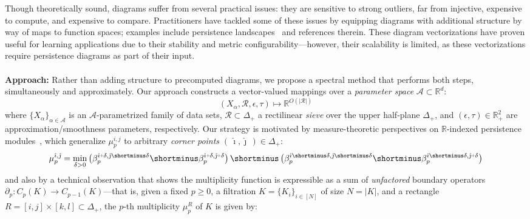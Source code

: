 \documentclass[10pt twocolumn]{article}
\numberwithin{equation}{section}
\newcommand{\+}{%
	\raisebox{0.18ex}{\scaleobj{0.55}{+}}
}
\theoremstyle{definition}
\theoremstyle{definition}
\begin{document}
\begin{multicols}{2}
Though theoretically sound, diagrams suffer from several practical issues: they are sensitive to strong outliers, far from injective, expensive to compute, and expensive to compare. 
Practitioners have tackled some of these issues by equipping diagrams with additional structure by way of maps to function spaces; examples include persistence landscapes~\cite{bubenik2015statistical} and references therein. 
These diagram vectorizations have proven useful for learning applications due to their stability and  metric configurability---however, their scalability is limited, as these vectorizations require persistence diagrams as part of their input. %
\\
\\
\noindent \textbf{Approach:}
Rather than adding structure to precomputed diagrams, we propose a spectral method that performs both steps, simultaneously and approximately. 
Our approach constructs a vector-valued mappings over a \emph{parameter space} $\mathcal{A} \subset \mathbb{R}^d$: 
\begin{equation*}\label{eq:relaxation_mapping}
	(X_\alpha, \mathcal{R}, \epsilon, \tau) \mapsto \mathbb{R}^{O(\lvert \mathcal{R} \rvert)}
\end{equation*}
where $\{X_\alpha\}_{\alpha \in \mathcal{A}}$ is an  $\mathcal{A}$-parametrized family of data sets, $\mathcal{R} \subset \Delta_+$ a rectilinear \emph{sieve} over the upper half-plane $\Delta_+$, and $(\epsilon, \tau) \in \mathbb{R}_+^2$ are approximation/smoothness parameters, respectively.
Our strategy is motivated by measure-theoretic perspectives on $\mathbb{R}$-indexed persistence modules~\cite{cerri2013betti, chazal2016structure}, which generalize $\mu_p^{i,j}$ to arbitrary \emph{corner points} $(\, \hat\imath, \hat\jmath \,) \in \Delta_+$:
\begin{multline*}\label{eq:measure}
\mu_p^{\hat\imath, \hat\jmath} = \min_{\delta > 0} \left(\beta_p^{\hat\imath \+ \delta, \hat\jmath \shortminus \delta} \shortminus \beta_p^{\hat\imath \+ \delta, \hat\jmath  \+ \delta} \right) \shortminus \left(\beta_p^{\hat\imath \shortminus \delta, \hat\jmath \shortminus \delta} \shortminus \beta_p^{\hat\imath \shortminus \delta, \hat\jmath  \+ \delta} \right)
\end{multline*}
and also by a technical observation that shows the multiplicity function is expressible as a sum of \emph{unfactored} boundary operators $\partial_p : C_p(K) \to C_{p-1}(K)$---that is, given a fixed $p \geq 0$, a filtration $K = \{K_i\}_{i\in [N]}$ of size $N = \lvert K \rvert$, and a rectangle $R = [i,j] \times [k,l] \subset \Delta_+$, the $p$-th multiplicity $\mu_p^{R}$ of $K$ is given by:

\end{multicols}
\end{document}
